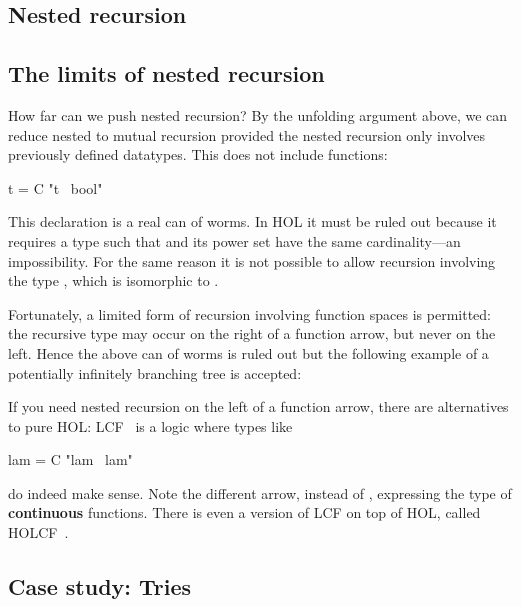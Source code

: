 

\subsection{Nested recursion}
\label{sec:nested-datatype}

{\makeatother}


\subsection{The limits of nested recursion}

How far can we push nested recursion? By the unfolding argument above, we can
reduce nested to mutual recursion provided the nested recursion only involves
previously defined datatypes. This does not include functions:
\begin{isabelle}
 t = C "t \isasymRightarrow\ bool"
\end{isabelle}
This declaration is a real can of worms.
In HOL it must be ruled out because it requires a type
 such that  and its power set  have the
same cardinality---an impossibility. For the same reason it is not possible
to allow recursion involving the type , which is isomorphic to
.

Fortunately, a limited form of recursion
involving function spaces is permitted: the recursive type may occur on the
right of a function arrow, but never on the left. Hence the above can of worms
is ruled out but the following example of a potentially infinitely branching tree is
accepted:
\smallskip


\bigskip

If you need nested recursion on the left of a function arrow, there are
alternatives to pure HOL: LCF~\cite{paulson87} is a logic where types like
\begin{isabelle}
 lam = C "lam \isasymrightarrow\ lam"
\end{isabelle}
do indeed make sense.  Note the different arrow,
\isa{\isasymrightarrow} instead of \isa{\isasymRightarrow},
expressing the type of \textbf{continuous} functions. 
There is even a version of LCF on top of HOL,
called HOLCF~\cite{MuellerNvOS99}.


\subsection{Case study: Tries}
\label{sec:Trie}


